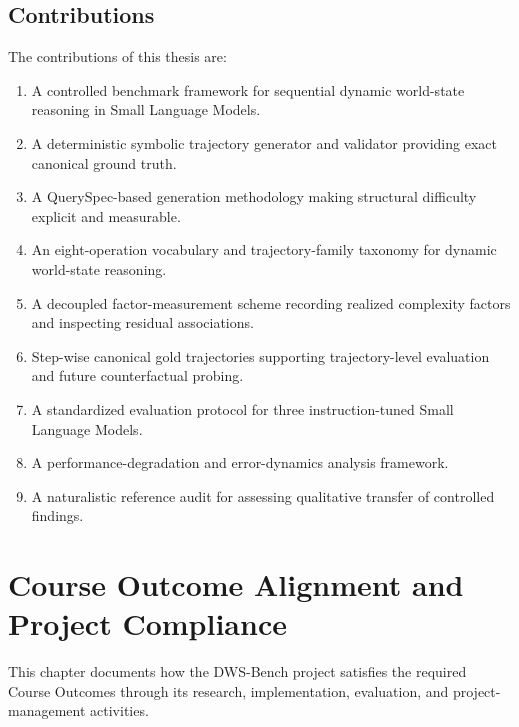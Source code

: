 \documentclass{iutbscthesis}
\begin{document}
\section{Contributions}
The contributions of this thesis are:
\begin{enumerate}[noitemsep]
    \item A controlled benchmark framework for sequential dynamic world-state reasoning in Small Language Models.
    \item A deterministic symbolic trajectory generator and validator providing exact canonical ground truth.
    \item A QuerySpec-based generation methodology making structural difficulty explicit and measurable.
    \item An eight-operation vocabulary and trajectory-family taxonomy for dynamic world-state reasoning.
    \item A decoupled factor-measurement scheme recording realized complexity factors and inspecting residual associations.
    \item Step-wise canonical gold trajectories supporting trajectory-level evaluation and future counterfactual probing.
    \item A standardized evaluation protocol for three instruction-tuned Small Language Models.
    \item A performance-degradation and error-dynamics analysis framework.
    \item A naturalistic reference audit for assessing qualitative transfer of controlled findings.
\end{enumerate}

\chapter{Course Outcome Alignment and Project Compliance}

This chapter documents how the DWS-Bench project satisfies the required Course Outcomes through its research, implementation, evaluation, and project-management activities.
\end{document}
